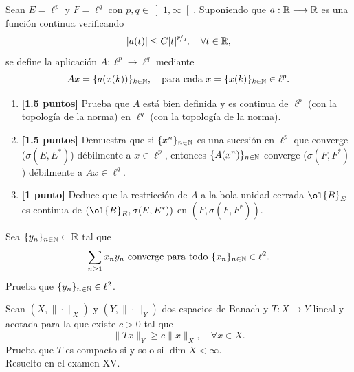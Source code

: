\documentclass[12pt]{article}
\begin{document}
    \begin{ejercicio}[4 puntos]
        Sean $E = \ell^p$ y $F = \ell^q$ con $p, q \in \left]1, \infty\right[$. Suponiendo que $a : \mathbb{R} \longrightarrow \mathbb{R}$ es una función continua verificando
        \[ |a(t)| \leq C|t|^{\nicefrac{p}{q}}, \quad \forall t \in \mathbb{R}, \]
        se define la aplicación $A : \ell^p \longrightarrow \ell^q$ mediante
        \[ Ax = \{a(x(k))\}_{k \in \mathbb{N}}, \quad \text{para cada } x = \{x(k)\}_{k \in \mathbb{N}} \in \ell^p. \]
        \begin{enumerate}[label=\textbf{\alph*)}]
            \item \textbf{[1.5 puntos]} Prueba que $A$ está bien definida y es continua de $\ell^p$ (con la topología de la norma) en $\ell^q$ (con la topología de la norma).
            \item \textbf{[1.5 puntos]} Demuestra que si $\{x^n\}_{n \in \mathbb{N}}$ es una sucesión en $\ell^p$ que converge ($\sigma(E, E^*)$) débilmente a $x \in \ell^p$, entonces $\{A(x^n)\}_{n \in \mathbb{N}}$ converge ($\sigma(F, F^*)$) débilmente a $Ax \in \ell^q$.
            \item \textbf{[1 punto]} Deduce que la restricción de $A$ a la bola unidad cerrada $\ol{B}_E$ es continua de $(\ol{B}_E, \sigma(E, E^*))$ en $(F, \sigma(F, F^*))$.
        \end{enumerate}
    \end{ejercicio}

    \newpage
    \setcounter{ejercicio}{0} %
    \noindent

    \begin{ejercicio}[3 puntos]
        Sea $\{y_n\}_{n \in \mathbb{N}} \subset \mathbb{R}$ tal que
        \[ \sum_{n \geq 1} x_n y_n \text{ converge para todo } \{x_n\}_{n \in \mathbb{N}} \in \ell^2. \]
        Prueba que $\{y_n\}_{n \in \mathbb{N}} \in \ell^2$.
    \end{ejercicio}

    \begin{ejercicio}[3 puntos]
        Sean $(X, \|\cdot\|_X)$ y $(Y, \|\cdot\|_Y)$ dos espacios de Banach y $T : X \longrightarrow Y$ lineal y acotada para la que existe $c > 0$ tal que
        \[ \|Tx\|_Y \geq c\|x\|_X, \quad \forall x \in X. \]
        Prueba que $T$ es compacto si y solo si $\dim X < \infty$.\\

        Resuelto en el examen XV.
    \end{ejercicio}
\end{document}
